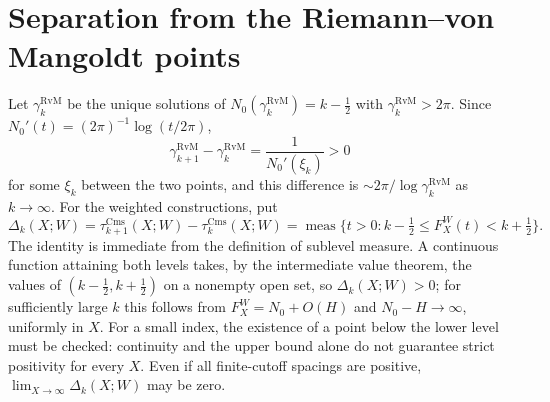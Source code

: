 \documentclass[11pt,a4paper]{article}
\numberwithin{equation}{section}
\theoremstyle{definition}
\theoremstyle{remark}
\newcommand{\meas}{\operatorname{meas}}
\newcommand{\Cms}{\mathrm{Cms}}
\begin{document}
\section{Separation from the Riemann--von Mangoldt points}\label{sec:spacing-v3}
Let $\gamma_k^{\mathrm{RvM}}$ be the unique solutions of
$N_0(\gamma_k^{\mathrm{RvM}})=k-\tfrac12$ with
$\gamma_k^{\mathrm{RvM}}>2\pi$. Since $N_0'(t)=(2\pi)^{-1}\log(t/2\pi)$,
\begin{equation}\label{eq:rvm-separation-v3}
\gamma_{k+1}^{\mathrm{RvM}}-\gamma_k^{\mathrm{RvM}}
=\frac{1}{N_0'(\xi_k)}>0
\end{equation}
for some $\xi_k$ between the two points, and this difference is
$\sim2\pi/\log\gamma_k^{\mathrm{RvM}}$ as $k\to\infty$.
For the weighted constructions, put
\begin{equation}\label{eq:gap-v3}
\Delta_k(X;W)=\tau_{k+1}^{\Cms}(X;W)-\tau_k^{\Cms}(X;W)
=\meas\{t>0:k-\tfrac12\le F_X^W(t)<k+\tfrac12\}.
\end{equation}
The identity is immediate from the definition of sublevel measure.
A continuous function attaining both levels takes, by the intermediate value theorem, the values of $(k-\frac12,k+\frac12)$ on a nonempty open set, so $\Delta_k(X;W)>0$;
for sufficiently large $k$ this follows from $F_X^W=N_0+O(H)$ and
$N_0-H\to\infty$, uniformly in $X$. For a small index, the existence
of a point below the lower level must be checked: continuity and the
upper bound alone do not guarantee strict positivity for every $X$.
Even if all finite-cutoff spacings are positive,
$\lim_{X\to\infty}\Delta_k(X;W)$ may be zero.
\end{document}
